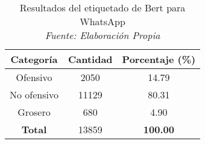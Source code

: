 \begin{itemize}
\begin{table}[!ht]
	\centering
	\begin{tabular}{|c|c|c|}
		\hline
		\textbf{Categoría} & \textbf{Cantidad} & \textbf{Porcentaje (\%)} \\ \hline
		Ofensivo & 2050 & 14.79 \\ 
		No ofensivo & 11129 & 80.31 \\ 
		Grosero & 680 & 4.90 \\ \hline
		\textbf{Total} & 13859 & \textbf{100.00} \\ \hline
	\end{tabular}
	\caption[Resultados del etiquetado de Bert para WhatsApp]{Resultados del etiquetado de Bert para WhatsApp
		\\\textit{Fuente: Elaboración Propia}}
	\label{tbl:whatsapp}
\end{table}
\end{itemize}

